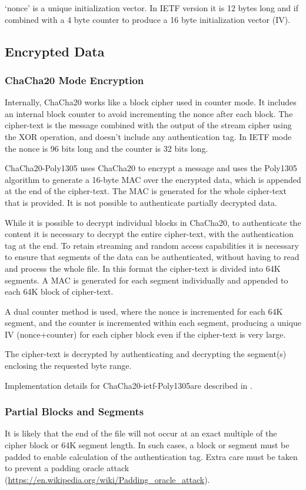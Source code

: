 \documentclass[10pt]{article}
\begin{document}
`nonce' is a unique initialization vector.
In IETF version it is 12 bytes long and if combined with a 4 byte counter to produce a 16 byte initialization
vector (IV).

\subsection{Encrypted Data}
\subsubsection{ChaCha20 Mode Encryption}

Internally, ChaCha20 works like a block cipher used in counter mode.
It includes an internal block counter to avoid incrementing the nonce after each block.
The cipher-text is the message combined with the output of the stream cipher using the XOR operation, 
and doesn't include any authentication tag.
In IETF mode the nonce is 96 bits long and the counter is 32 bits long.

ChaCha20-Poly1305 uses ChaCha20 to encrypt a message and uses the Poly1305 algorithm to
generate a 16-byte MAC over the encrypted data, which is appended at the end of the 
cipher-text.
The MAC is generated for the whole cipher-text that is provided.
It is not possible to authenticate partially decrypted data.

While it is possible to decrypt individual blocks in ChaCha20, to authenticate the content 
it is necessary to decrypt the entire cipher-text,  with the authentication tag at the end. 
To retain streaming and random access capabilities it is necessary to ensure that segments 
of the data can be authenticated, without having to read and process the whole file.
In this format the cipher-text is divided into 64K segments.
A MAC is generated for each segment individually and appended to each 64K block of cipher-text.

A dual counter method is used, where the nonce is incremented for each 64K segment, and
the counter is incremented within each segment, producing a unique IV (nonce+counter) for 
each cipher block even if the cipher-text is very large. 

The cipher-text is decrypted by authenticating and decrypting the segment(s) enclosing
the requested byte range. 

Implementation details for ChaCha20-ietf-Poly1305are described in \cite{RFC8439}.

\subsubsection{Partial Blocks and Segments}
It is likely that the end of the file will not occur at an exact multiple of the cipher block or 
64K segment length.
In such cases, a block or segment must be padded to enable calculation of the authentication tag. 
Extra care must be taken to prevent a padding oracle attack (\url{https://en.wikipedia.org/wiki/Padding_oracle_attack}).
\end{document}
